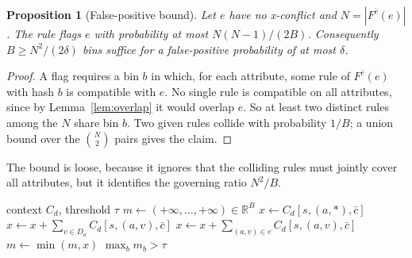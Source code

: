 \documentclass[preprint,12pt]{elsarticle}
\newtheorem{proposition}{Proposition}
\theoremstyle{definition}
\begin{document}
\begin{proposition}[False-positive bound]
\label{prop:fp}
Let $e$ have no x-conflict and $N=|F^{\bar c}(e)|$. The rule flags $e$ with probability at most $N(N-1)/(2B)$. Consequently $B\ge N^2/(2\delta)$ bins suffice for a false-positive probability of at most $\delta$.
\end{proposition}
\begin{proof}
A flag requires a bin $b$ in which, for each attribute, some rule of $F^{\bar c}(e)$ with hash $b$ is compatible with $e$. No single rule is compatible on all attributes, since by Lemma~\ref{lem:overlap} it would overlap $e$. So at least two distinct rules among the $N$ share bin $b$. Two given rules collide with probability $1/B$; a union bound over the $\binom N2$ pairs gives the claim.
\end{proof}
The bound is loose, because it ignores that the colliding rules must jointly cover all attributes, but it identifies the governing ratio $N^2/B$.

\begin{algorithm}[t]
\caption{\textsc{DetectConflict} at domain $d$ for one own hyperedge $e$ (scope $s$, effect $c$)}
\label{alg:conflict}
\begin{algorithmic}[1]
\Require context $C_d$, threshold $\tau$
\State $m\gets(+\infty,\dots,+\infty)\in\mathbb{R}^B$
  \State $x\gets C_d[s,(a,\ast),\bar c]$ 
   
    \State $x\gets x+\sum_{v\in D_a}C_d[s,(a,v),\bar c]$
  \Else
    \State $x\gets x+\sum_{(a,v)\in e}C_d[s,(a,v),\bar c]$ 
  \EndIf
  \State $m\gets\min(m,x)$ 
\EndFor
\State \Return $\max_b m_b>\tau$
\end{algorithmic}
\end{algorithm}
\end{document}

